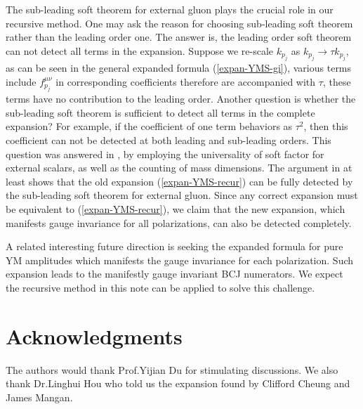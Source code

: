 \documentclass[preprint,showpacs,onecolumn,nofootinbib]{revtex4}
\def\eref#1{(\ref{#1})}
\begin{document}
The sub-leading soft theorem for external gluon plays the crucial role in our recursive method. One may ask the reason for choosing sub-leading soft theorem rather than the leading order one. The answer is, the leading order soft theorem can not detect all terms in the expansion. Suppose we re-scale $k_{p_j}$ as $k_{p_j}\to\tau k_{p_j}$, as can be seen in the general expanded formula \eref{expan-YMS-gi}, various terms include $f_{p_j}^{\mu\nu}$ in corresponding coefficients therefore are accompanied with $\tau$, these terms have no contribution to the leading order.
Another question is whether the sub-leading soft theorem is sufficient to detect all terms in the complete expansion? For example, if the coefficient of one term behaviors as $\tau^2$, then this coefficient can not be detected at both leading and sub-leading orders. This question was answered in \cite{Zhou:2022orv}, by employing the universality of soft factor for external scalars, as well as the counting of mass dimensions. The argument in \cite{Zhou:2022orv} at least shows that the old expansion \eref{expan-YMS-recur} can be fully detected by the sub-leading soft theorem for external gluon. Since any correct expansion must be equivalent to \eref{expan-YMS-recur}, we claim that the new expansion, which manifests gauge invariance for all polarizations, can also be detected completely.

A related interesting future direction is seeking the expanded formula for pure YM amplitudes which manifests the gauge invariance for each polarization. Such expansion leads to the manifestly gauge invariant BCJ numerators. We expect the recursive method in this note can be applied to solve this challenge.

\section*{Acknowledgments}

The authors would thank Prof.Yijian Du for stimulating discussions. We also thank Dr.Linghui Hou who told us the expansion found by Clifford Cheung and James Mangan.

\end{document}
